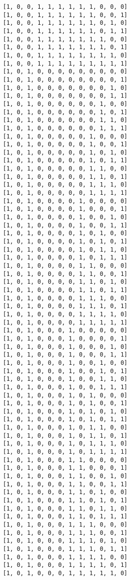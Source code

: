 \documentclass[11pt]{article}
\begin{document}
\begin{Verbatim}[commandchars=\\\{\}]
[1, 0, 0, 1, 1, 1, 1, 1, 1, 0, 0, 0]
[1, 0, 0, 1, 1, 1, 1, 1, 1, 0, 0, 1]
[1, 0, 0, 1, 1, 1, 1, 1, 1, 0, 1, 0]
[1, 0, 0, 1, 1, 1, 1, 1, 1, 0, 1, 1]
[1, 0, 0, 1, 1, 1, 1, 1, 1, 1, 0, 0]
[1, 0, 0, 1, 1, 1, 1, 1, 1, 1, 0, 1]
[1, 0, 0, 1, 1, 1, 1, 1, 1, 1, 1, 0]
[1, 0, 0, 1, 1, 1, 1, 1, 1, 1, 1, 1]
[1, 0, 1, 0, 0, 0, 0, 0, 0, 0, 0, 0]
[1, 0, 1, 0, 0, 0, 0, 0, 0, 0, 0, 1]
[1, 0, 1, 0, 0, 0, 0, 0, 0, 0, 1, 0]
[1, 0, 1, 0, 0, 0, 0, 0, 0, 0, 1, 1]
[1, 0, 1, 0, 0, 0, 0, 0, 0, 1, 0, 0]
[1, 0, 1, 0, 0, 0, 0, 0, 0, 1, 0, 1]
[1, 0, 1, 0, 0, 0, 0, 0, 0, 1, 1, 0]
[1, 0, 1, 0, 0, 0, 0, 0, 0, 1, 1, 1]
[1, 0, 1, 0, 0, 0, 0, 0, 1, 0, 0, 0]
[1, 0, 1, 0, 0, 0, 0, 0, 1, 0, 0, 1]
[1, 0, 1, 0, 0, 0, 0, 0, 1, 0, 1, 0]
[1, 0, 1, 0, 0, 0, 0, 0, 1, 0, 1, 1]
[1, 0, 1, 0, 0, 0, 0, 0, 1, 1, 0, 0]
[1, 0, 1, 0, 0, 0, 0, 0, 1, 1, 0, 1]
[1, 0, 1, 0, 0, 0, 0, 0, 1, 1, 1, 0]
[1, 0, 1, 0, 0, 0, 0, 0, 1, 1, 1, 1]
[1, 0, 1, 0, 0, 0, 0, 1, 0, 0, 0, 0]
[1, 0, 1, 0, 0, 0, 0, 1, 0, 0, 0, 1]
[1, 0, 1, 0, 0, 0, 0, 1, 0, 0, 1, 0]
[1, 0, 1, 0, 0, 0, 0, 1, 0, 0, 1, 1]
[1, 0, 1, 0, 0, 0, 0, 1, 0, 1, 0, 0]
[1, 0, 1, 0, 0, 0, 0, 1, 0, 1, 0, 1]
[1, 0, 1, 0, 0, 0, 0, 1, 0, 1, 1, 0]
[1, 0, 1, 0, 0, 0, 0, 1, 0, 1, 1, 1]
[1, 0, 1, 0, 0, 0, 0, 1, 1, 0, 0, 0]
[1, 0, 1, 0, 0, 0, 0, 1, 1, 0, 0, 1]
[1, 0, 1, 0, 0, 0, 0, 1, 1, 0, 1, 0]
[1, 0, 1, 0, 0, 0, 0, 1, 1, 0, 1, 1]
[1, 0, 1, 0, 0, 0, 0, 1, 1, 1, 0, 0]
[1, 0, 1, 0, 0, 0, 0, 1, 1, 1, 0, 1]
[1, 0, 1, 0, 0, 0, 0, 1, 1, 1, 1, 0]
[1, 0, 1, 0, 0, 0, 0, 1, 1, 1, 1, 1]
[1, 0, 1, 0, 0, 0, 1, 0, 0, 0, 0, 0]
[1, 0, 1, 0, 0, 0, 1, 0, 0, 0, 0, 1]
[1, 0, 1, 0, 0, 0, 1, 0, 0, 0, 1, 0]
[1, 0, 1, 0, 0, 0, 1, 0, 0, 0, 1, 1]
[1, 0, 1, 0, 0, 0, 1, 0, 0, 1, 0, 0]
[1, 0, 1, 0, 0, 0, 1, 0, 0, 1, 0, 1]
[1, 0, 1, 0, 0, 0, 1, 0, 0, 1, 1, 0]
[1, 0, 1, 0, 0, 0, 1, 0, 0, 1, 1, 1]
[1, 0, 1, 0, 0, 0, 1, 0, 1, 0, 0, 0]
[1, 0, 1, 0, 0, 0, 1, 0, 1, 0, 0, 1]
[1, 0, 1, 0, 0, 0, 1, 0, 1, 0, 1, 0]
[1, 0, 1, 0, 0, 0, 1, 0, 1, 0, 1, 1]
[1, 0, 1, 0, 0, 0, 1, 0, 1, 1, 0, 0]
[1, 0, 1, 0, 0, 0, 1, 0, 1, 1, 0, 1]
[1, 0, 1, 0, 0, 0, 1, 0, 1, 1, 1, 0]
[1, 0, 1, 0, 0, 0, 1, 0, 1, 1, 1, 1]
[1, 0, 1, 0, 0, 0, 1, 1, 0, 0, 0, 0]
[1, 0, 1, 0, 0, 0, 1, 1, 0, 0, 0, 1]
[1, 0, 1, 0, 0, 0, 1, 1, 0, 0, 1, 0]
[1, 0, 1, 0, 0, 0, 1, 1, 0, 0, 1, 1]
[1, 0, 1, 0, 0, 0, 1, 1, 0, 1, 0, 0]
[1, 0, 1, 0, 0, 0, 1, 1, 0, 1, 0, 1]
[1, 0, 1, 0, 0, 0, 1, 1, 0, 1, 1, 0]
[1, 0, 1, 0, 0, 0, 1, 1, 0, 1, 1, 1]
[1, 0, 1, 0, 0, 0, 1, 1, 1, 0, 0, 0]
[1, 0, 1, 0, 0, 0, 1, 1, 1, 0, 0, 1]
[1, 0, 1, 0, 0, 0, 1, 1, 1, 0, 1, 0]
[1, 0, 1, 0, 0, 0, 1, 1, 1, 0, 1, 1]
[1, 0, 1, 0, 0, 0, 1, 1, 1, 1, 0, 0]
[1, 0, 1, 0, 0, 0, 1, 1, 1, 1, 0, 1]
[1, 0, 1, 0, 0, 0, 1, 1, 1, 1, 1, 0]

\end{Verbatim}
\end{document}
